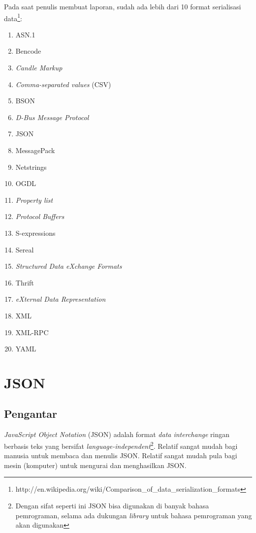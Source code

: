 \documentclass[a4paper, 12pt]{report}
\begin{document}
\onehalfspacing Pada saat penulis membuat laporan, sudah ada lebih dari 10 format serialisasi data\footnote{http://en.wikipedia.org/wiki/Comparison\_of\_data\_serialization\_formats}:
\begin{enumerate}
  \item ASN.1
  \item Bencode
  \item \textit{Candle Markup}
  \item \textit{Comma-separated values} (CSV)
  \item BSON
  \item \textit{D-Bus Message Protocol}
  \item JSON
  \item MessagePack
  \item Netstrings
  \item OGDL
  \item \textit{Property list}
  \item \textit{Protocol Buffers}
  \item S-expressions
  \item Sereal
  \item \textit{Structured Data eXchange Formats}
  \item Thrift
  \item \textit{eXternal Data Representation}
  \item XML
  \item XML-RPC
  \item YAML
\end{enumerate}


\section{JSON}

\subsection{Pengantar}
\onehalfspacing \textit{JavaScript Object Notation} (JSON) adalah format \textit{data interchange} ringan berbasis teks yang bersifat \textit{language-independent}\footnote{Dengan sifat seperti ini JSON bisa digunakan di banyak bahasa pemrograman, selama ada dukungan \textit{library} untuk bahasa pemrograman yang akan digunakan}. Relatif sangat mudah bagi manusia untuk membaca dan menulis JSON. Relatif sangat mudah pula bagi mesin (komputer) untuk mengurai dan menghasilkan JSON.
\end{document}
